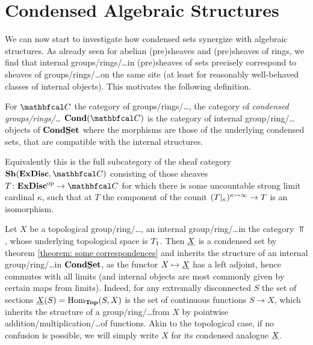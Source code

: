 

\section{Condensed Algebraic Structures}
\label{section: condensed algebraic structures}

%	

We can now start to investigate how condensed sets synergize with algebraic structures. As already seen for abelian (pre)sheaves and (pre)sheaves of rings, we find that internal groups/rings/\dots in (pre)sheaves of sets precisely correspond to sheaves of groups/rings/\dots on the same site (at least for reasonably well-behaved classes of internal objects). This motivates the following definition.
\begin{definition}
	\label{definition: condensed groups/rings/...}
	
	For $\category C$ the category of groups/rings/\dots, the category of \emph{condensed groups/rings/\dots} $\condensed{\category C}$ is the category of internal group/ring/\dots objects of ${{{\mathbf{Cond}}}{{\mathbf{\underline{S}et}}}}$ where the morphisms are those of the underlying condensed sets, that are compatible with the internal structures.
	
	Equivalently this is the full subcategory of the sheaf category $\Sheaves{\extremallyDisconnectedSets}{\category C}$ consisting of those sheaves $T\colon \extremallyDisconnectedSets^\op\to \category C$ for which there is some uncountable strong limit cardinal $\kappa$, such that at $T$ the component of the counit $( T{\vert_{\kappa}})^{\kappa\rightsquigarrow \infty}\to T$ is an isomorphism.
\end{definition}

\begin{definition}	
	
	Let $X$ be a topological group/ring/\dots, \ie an internal group/ring/\dots in the category $\Top$, whose underlying topological space is ${T_1}$. Then $\underline{X}$ is a condensed set by theorem \ref{theorem: some correspondences} and inherits the structure of an internal group/ring/\dots in ${{{\mathbf{Cond}}}{{\mathbf{\underline{S}et}}}}$, as the functor $X\mapsto \underline{X}$ has a left adjoint, hence commutes with all limits (and internal objects are most commonly given by certain maps from limits). Indeed, for any extremally disconnected $S$ the set of sections $\underline{X}(S) = {\operatorname{Hom}}_{{\mathbf{Top}}}(S, X)$ is the set of continuous functions $S\to X$, which inherits the structure of a group/ring/\dots from $X$ by pointwise addition/multiplication/\dots of functions. Akin to the topological case, if no confusion is possible, we will simply write $X$ for its condensed analogue $\underline{X}$.
\end{definition}

